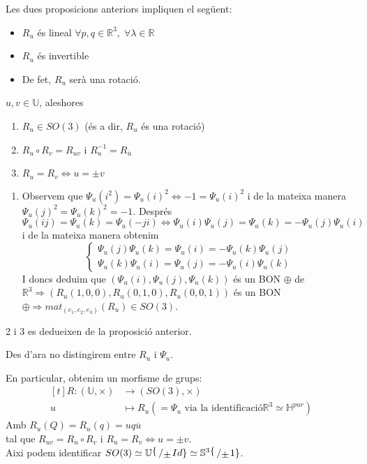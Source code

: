 \documentclass[a4paper,12pt]{article}
\begin{document}
	Les dues proposicions anteriors impliquen el següent:
	\begin{itemize}
		\item $R_u$ és lineal $\forall p,q \in \mathbb{R}^3,\;\forall\lambda\in\mathbb{R}$
		\item $R_u$ és invertible
		\item De fet, $R_u$ serà una rotació.
	\end{itemize}
	\begin{teorema}
		$u, v \in \mathbb{U}$, aleshores
		\begin{enumerate}
			\item $R_u \in SO(3)$ (és a dir, $R_u$ és una rotació)
			\item $R_u \circ R_v = R_{uv}$ i $R_u^{-1} = R_{\overline{u}}$
			\item $R_u = R_v \iff u = \pm v$
		\end{enumerate}
	\end{teorema}
	\begin{demostracio}
		\begin{enumerate}
			\item Observem que $\Psi_u(i^2) = \Psi_u(i)^2 \iff -1 = \Psi_u(i)^2$ i de la mateixa manera $\Psi_u(j)^2=\Psi_u(k)^2 = -1$.
			Després $\Psi_u(ij)=\Psi_u(k)=\Psi_u(-ji) \iff \Psi_u(i)\Psi_u(j) = \Psi_u(k) = -\Psi_u(j)\Psi_u(i)$ i de la mateixa manera obtenim
			\begin{displaymath}
				\begin{cases}
					\Psi_u(j)\Psi_u(k) = \Psi_u(i) = -\Psi_u(k)\Psi_u(j)\\
					\Psi_u(k)\Psi_u(i) = \Psi_u(j) = -\Psi_u(i)\Psi_u(k)
				\end{cases}
			\end{displaymath}
			I doncs deduim que $\left(\Psi_u(i), \Psi_u(j), \Psi_u(k)\right)$ és un BON $\oplus$ de $\mathbb{R}^3 \Rightarrow (R_u(1,0,0), R_u(0,1,0), R_u(0,0,1))$ és un BON $\oplus \Rightarrow mat_{(e_1, e_2, e_3)}(R_u) \in SO(3)$.
		\end{enumerate}
		2 i 3 es dedueixen de la proposició anterior.
	\end{demostracio}
	\begin{notacio}
		Des d'ara no distingirem entre $R_u$ i $\Psi_u$.
	\end{notacio}
	\begin{obs}
		En particular, obtenim un morfisme de grups:
		\begin{displaymath}
			\begin{aligned}[t]
				R: (\mathbb{U}, \times) &\to (SO(3), \times)\\
				u &\mapsto R_u (= \Psi_u \text{ via la identificació} \mathbb{R}^3 \simeq \mathbb{H}^{pur})
			\end{aligned}
		\end{displaymath}
		Amb $R_u(Q) = R_u(q) = uq\overline{u}$\\
		tal que $R_{uv} = R_u \circ R_v$ i $R_u = R_v \iff u = \pm v$.\\
		Aixi podem identificar $SO(3) \simeq \mathbb{U}\bigslant\{\pm Id\} \simeq \mathbb{S}^3\bigslant\{\pm 1\}$.
	\end{obs}
\end{document}
